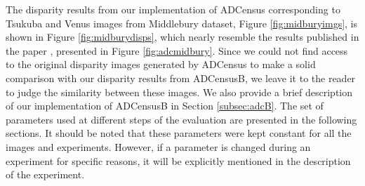The disparity results from our implementation of ADCensus corresponding to Tsukuba and Venus images from Middlebury dataset, 
Figure \ref{fig:midburyimgs}, is shown in Figure \ref{fig:midburydisps}, 
which nearly resemble the results published in the paper \cite{mei11}, presented in Figure \ref{fig:adcmidbury}. 
Since we could not find access to the original disparity images generated by ADCensus to make a solid comparison with our disparity results from ADCensusB, 
we leave it to the reader to judge the similarity between these images. We also provide a brief description of our implementation of 
ADCensusB in Section \ref{subsec:adcB}. \newline
The set of parameters used at different steps of the evaluation are presented in the following sections.
It should be noted that these parameters were kept constant for all the images and experiments. However, if a parameter is changed during an experiment for specific
reasons, it will be explicitly mentioned in the description of the experiment.

